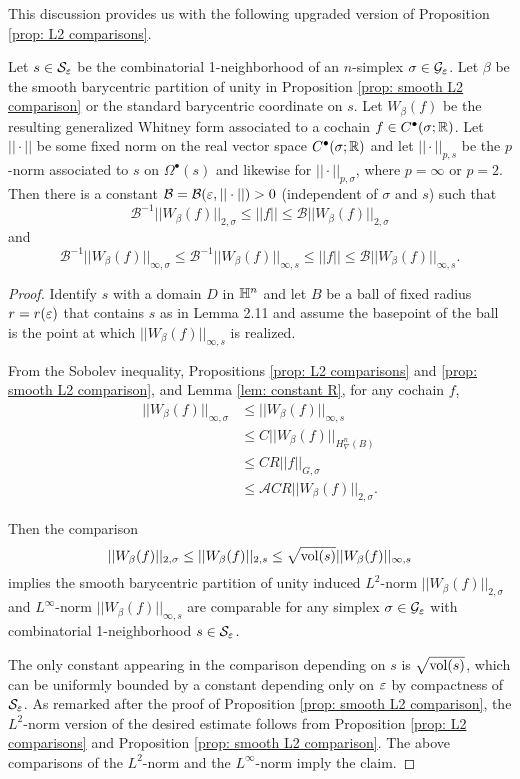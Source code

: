 This discussion provides us with the following upgraded version of Proposition \ref{prop: L2 comparisons}.

\begin{prop} \label{prop: smooth comparison}
Let $s\in\mathcal S_\varepsilon$ be the combinatorial 1-neighborhood of an $n$-simplex $\sigma \in\mathcal G_\varepsilon$. Let $\beta$ be the smooth barycentric partition of unity in Proposition \ref{prop: smooth L2 comparison} or the standard barycentric coordinate on $s$. Let $W_{\beta}(f)$ be the resulting generalized Whitney form associated to a cochain $f\in C^{\bullet}(\sigma;\mathbb R)$. Let $||\cdot||$ be some fixed norm on the real vector space $C^{\bullet}(\sigma;\mathbb R)$ and let $||\cdot||_{p,s}$ be the $p$-norm associated to $s$ on $\Omega^{\bullet}(s)$ and likewise for $||\cdot||_{p,\sigma}$, where $p = {\infty}$ or $p=2$.
Then there is a constant $\mathcal B = \mathcal B (\varepsilon,||\cdot||)>0$ (independent of $\sigma$ and $s$) such that $$\mathcal B ^{-1}|| W_{\beta}(f)||_{2,{\sigma}}\leq   ||f||\leq \mathcal B|| W_{\beta}(f)||_{2,\sigma}$$ and
$$\mathcal B^{-1}|| W_{\beta}(f) ||_{\infty, \sigma}\leq \mathcal B^{-1} || W_{\beta}(f)||_{\infty,s} \leq ||f||\leq \mathcal B|| W_{\beta}(f)||_{\infty,s}.$$
\end{prop}

\begin{proof}
    Identify $s$ with a domain $D$ in $\mathbb H^n$ and let $B$ be a ball of fixed radius $r = r(\varepsilon)$ that contains $s$ as in Lemma 2.11 and assume the basepoint of the ball is the point at which $||W_{\beta}(f)||_{\infty, s}$ is realized.

    From the Sobolev inequality, Propositions \ref{prop: L2 comparisons} and \ref{prop: smooth L2 comparison}, and Lemma \ref{lem: constant R}, for any cochain $f$,
        \begin{align*}
        ||W_{\beta}(f)||_{\infty,\sigma}&\leq ||W_{\beta}(f)||_{\infty,s}\\
        &\leq C||W_{\beta}(f)||_{H^n_{\nabla}(B)}\\
        &\leq CR||f||_{G,\sigma} \\
        &\leq \mathcal ACR||W_{\beta}(f)||_{2,\sigma}.
        \end{align*}

    Then the comparison $$||W_{\beta}(f)||_{2,\sigma}\leq ||W_{\beta}(f)||_{2,s}\leq\sqrt{\operatorname{vol}(s)} ||W_{\beta}(f)||_{\infty,s}$$ implies the smooth barycentric partition of unity induced $L^2$-norm $||W_{\beta}(f)||_{2,\sigma} $ and $L^{\infty}$-norm $||W_{\beta}(f)||_{\infty,s}$ are comparable for any simplex $\sigma\in\mathcal G_\varepsilon$ with combinatorial 1-neighborhood
    $s\in \mathcal S_\varepsilon$.

    The only constant appearing in the comparison depending on $s$ is $\sqrt{\operatorname{vol}(s)}$, which can be uniformly bounded by a constant depending only on $\varepsilon$ by compactness of $\mathcal S_\varepsilon$. As remarked after the proof of Proposition \ref{prop: smooth L2 comparison}, the $L^2$-norm version of the desired estimate follows from Proposition \ref{prop: L2 comparisons} and Proposition \ref{prop: smooth L2 comparison}. The above comparisons of the $L^2$-norm and the $L^{\infty}$-norm imply the claim.
\end{proof}
